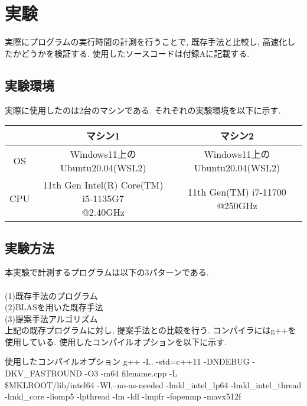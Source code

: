 \documentclass[11pt,a4paper]{jsreport}
\theoremstyle{definition}
\begin{document}
\chapter{実験}
	実際にプログラムの実行時間の計測を行うことで, 既存手法と比較し, 高速化したかどうかを検証する. 使用したソースコードは付録Aに記載する.
\section{実験環境}
	実際に使用したのは2台のマシンである. それぞれの実験環境を以下に示す.
\begin{table}[h]
\centering
\small
\begin{tabular}{c|c|c}
 & マシン1 & マシン2 \\ \hline \hline
OS & Windows11上のUbuntu20.04(WSL2) & Windows11上のUbuntu20.04(WSL2) \\ \hline
CPU &  \makecell{11th Gen Intel(R) Core(TM) i5-1135G7 \\ @2.40GHz} & \makecell{11th Gen(TM) i7-11700 \\ @250GHz} \\ \hline
\end{tabular}
\end{table}

\section{実験方法}
	本実験で計測するプログラムは以下の3パターンである. \\
	\\
	(1)既存手法のプログラム \\
	(2)BLASを用いた既存手法 \\
	(3)提案手法アルゴリズム \\
上記の既存プログラムに対し, 提案手法との比較を行う. コンパイラにはg++を使用している. 使用したコンパイルオプションを以下に示す.

\begin{itembox}[l]{使用したコンパイルオプション}
g++ -I.. -std=c++11 -DNDEBUG -DKV\_FASTROUND -O3 -m64 filename.cpp -L \\
\${MKLROOT}/lib/intel64 -Wl,--no-as-needed -lmkl\_intel\_lp64 -lmkl\_intel\_thread \\
-lmkl\_core -liomp5 -lpthread -lm -ldl -lmpfr -fopenmp -mavx512f
\end{itembox}
\end{document}
